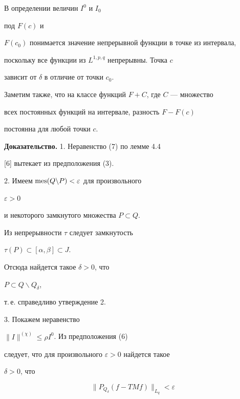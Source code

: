 \begin{notenonum} В определении величин $I^0$ и $I_0$


под $F(c)$ и 


$F(c_0)$ понимается значение непрерывной функции в точке из интервала,


поскольку все функции из $L^{1,p,q}$ непрерывны. Точка $c$


зависит от $\delta$ в отличие от точки $c_0$.


Заметим также, что на классе функций $F+C$, где $C$ --- множество


всех постоянных функций на интервале, разность $F-F(c)$


постоянна для любой точки $c$.


\end{notenonum}








{\bf Доказательство.} 1. Неравенство (7) по лемме 4.4 


[6] вытекает из предположения (3).





2. Имеем $\operatorname{mes}(Q\backslash P)<\varepsilon$ для произвольного


$\varepsilon >0$


и некоторого замкнутого множества $P\subset Q$.


Из непрерывности $\tau$ следует замкнутость


$\tau(P)\subset [\alpha,\beta]\subset J$.


Отсюда найдется такое $\delta>0$, что


$P\subset Q\backslash Q_{\delta}$,


т.\,е. справедливо утверждение 2.





3. Покажем неравенство


$\|I\|^{(\chi)}\le \rho I^0$. Из предположения (6)


следует, что для произвольного $\varepsilon>0$ найдется такое


$\delta >0$, что


\addtocounter{equation}{1}


\begin{equation}


\|P_{Q_{\delta}}(f-TMf)\|_{L_q}<\varepsilon


\end{equation}


